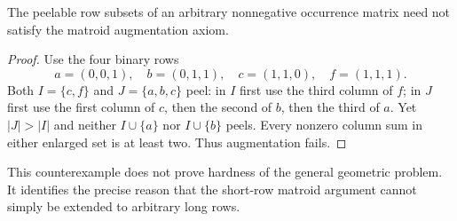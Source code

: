\begin{proposition}
\label{prop:not-matroid}
The peelable row subsets of an arbitrary nonnegative occurrence matrix
need not satisfy the matroid augmentation axiom.
\end{proposition}

\begin{proof}
Use the four binary rows
\[
 a=(0,0,1),\quad b=(0,1,1),\quad
 c=(1,1,0),\quad f=(1,1,1).
\]
Both $I=\{c,f\}$ and $J=\{a,b,c\}$ peel: in $I$ first use the third
column of $f$; in $J$ first use the first column of $c$, then the second
of $b$, then the third of $a$. Yet $|J|>|I|$ and neither $I\cup\{a\}$
nor $I\cup\{b\}$ peels. Every nonzero column sum in either enlarged set
is at least two. Thus augmentation fails.
\end{proof}

This counterexample does not prove hardness of the general geometric
problem. It identifies the precise reason that the short-row matroid
argument cannot simply be extended to arbitrary long rows.
